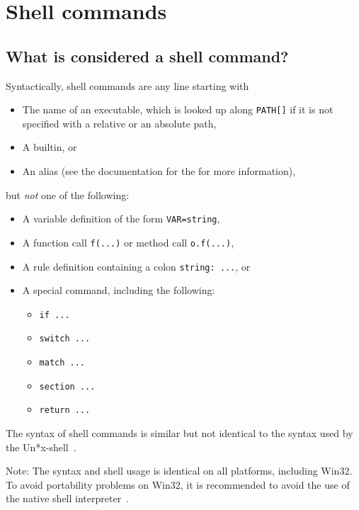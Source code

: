%
\chapter{Shell commands}
\label{chapter:shell}

\section{What is considered a shell command?}

Syntactically, shell commands are any line starting with
\begin{itemize}
\item The name of an executable, which is looked up along \verb+PATH[]+ if it is not specified with
  a relative or an absolute path,
\item A builtin, or
\item An alias (see the documentation for the  for more information),
\end{itemize}

but \emph{not} one of the following:

\begin{itemize}
\item A variable definition of the form \verb+VAR=string+,
\item A function call \verb+f(...)+ or method call \verb+o.f(...)+,
\item A rule definition containing a colon \verb+string: ...+, or
\item A special command, including the following:
  \begin{itemize}
  \item \verb+if ...+
  \item \verb+switch ...+
  \item \verb+match ...+
  \item \verb+section ...+
  \item \verb+return ...+
  \end{itemize}
\end{itemize}

The syntax of shell commands is similar but not identical to the syntax used by the
Un*x-shell~.

Note: The syntax and shell usage is identical on all platforms, including Win32.  To avoid
portability problems on Win32, it is recommended to avoid the use of the native shell
interpreter~.

